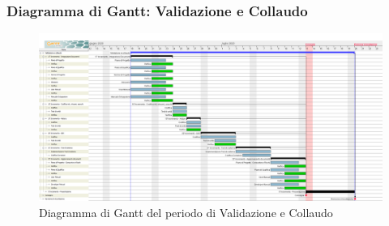 	\subsubsection{Diagramma di Gantt: Validazione e Collaudo}
		\begin{figure}[h]
			\centering
			\includegraphics[width=1.1\textwidth]{./res/img/DiagrammiGantt/validaGantt}
			\caption{Diagramma di Gantt del periodo di Validazione e Collaudo}
		\end{figure}
